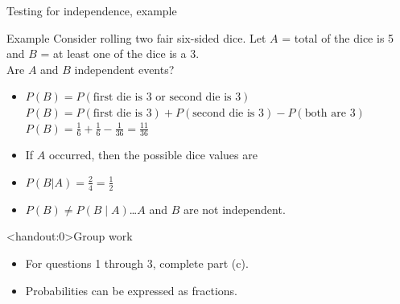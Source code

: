 \documentclass[xcolor=table, aspectratio=169, bigger]{beamer}
\begin{document}
\begin{frame}{Testing for independence, example}
\begin{exampleblock}{Example}
Consider rolling two fair six-sided dice. Let $A$ = total of the dice is 5 and $B$ = at least one of the dice is a 3.\\
\medskip
Are $A$ and $B$ independent events?
\begin{itemize}
\pause
\item $P(B) = P(\text{first die is 3 or second die is 3}) $\\
$P(B) = P(\text{first die is 3}) + P(\text{second die is 3}) - P(\text{both are 3}) $\\
$P(B) = \frac 1 6 + \frac 1 6 - \frac 1 {36} = \frac {11}{36}$
\pause
\item If $A$ occurred, then the possible dice values are\\ \smallskip
{} \smallskip

\pause
\item $P(B|A) = \frac 2 4 = \frac 1 2$

\pause
\item $P(B) \ne P(B \mid A)$\ldots $A$ and $B$ are not independent.
\end{itemize} 
\end{exampleblock}
\end{frame}

\begin{frame}<handout:0>{Group work}
\begin{block}{}
\large
\begin{itemize}
\item For questions 1 through 3, complete part (c).
\item Probabilities can be expressed as fractions.
\end{itemize}
\end{block}
\end{frame}
\end{document}
